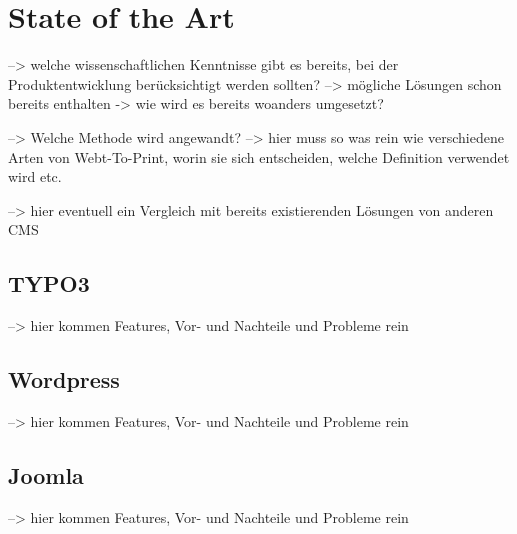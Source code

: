 \chapter{State of the Art}
--> welche wissenschaftlichen Kenntnisse gibt es bereits, bei der Produktentwicklung berücksichtigt werden sollten?
    --> mögliche Lösungen schon bereits enthalten -> wie wird es bereits woanders umgesetzt?

--> Welche Methode wird angewandt?
    --> hier muss so was rein wie verschiedene Arten von Webt-To-Print, worin sie sich entscheiden, welche Definition verwendet wird etc.

--> hier eventuell ein Vergleich mit bereits existierenden Lösungen von anderen CMS


\section{TYPO3}
--> hier kommen Features, Vor- und Nachteile und Probleme rein

\section{Wordpress}
--> hier kommen Features, Vor- und Nachteile und Probleme rein

\section{Joomla}
--> hier kommen Features, Vor- und Nachteile und Probleme rein